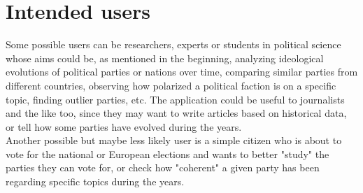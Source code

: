 \documentclass[]{article}
\begin{document}
\section{Intended users}
Some possible users can be researchers, experts or students in political science whose aims could be, as mentioned in the beginning, analyzing ideological evolutions of political parties or nations over time, comparing similar parties from different countries, observing how polarized a political faction is on a specific topic, finding outlier parties, etc. The application could be useful to journalists and the like too, since they may want to write articles based on historical data, or tell how some parties have evolved during the years.\\
Another possible but maybe less likely user is a simple citizen who is about to vote for the national or European elections and wants to better "study" the parties they can vote for, or check how "coherent" a given party has been regarding specific topics during the years.
\end{document}
